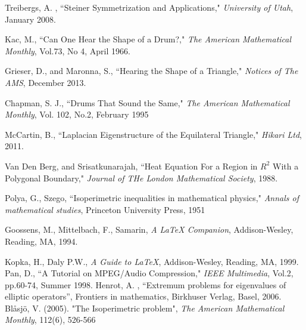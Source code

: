 \documentclass[12pt]{report}
\numberwithin{definition}{section}
\begin{document}
 \begin{thebibliography}{100}
  \singlespacing
   Treibergs, A. , ``Steiner Symmetrization and Applications," \emph{University of Utah},  January 2008.
 
  Kac, M., ``Can One Hear the Shape of a Drum?," \emph{The American Mathematical Monthly}, Vol.73, No 4, April 1966.
 
 
  Grieser, D., and Maronna, S., ``Hearing the Shape of a Triangle," \emph{Notices of The AMS}, December 2013.
 
  Chapman, S. J., ``Drums That Sound the Same," \emph{The American Mathematical Monthly}, Vol. 102, No.2, February 1995
 
  McCartin, B., ``Laplacian Eigenstructure of the Equilateral Triangle," \emph{Hikari Ltd}, 2011.

 Van Den Berg, and Srisatkunarajah, ``Heat Equation For a Region in $R^2$ With  a Polygonal Boundary," \emph{Journal of THe London Mathematical Society}, 1988.
 

 
 Polya, G., Szego, ``Isoperimetric inequalities in mathematical physics," \emph{Annals of mathematical studies}, Princeton University Press, 1951

 Goossens, M., Mittelbach, F., Samarin, \emph{A LaTeX Companion}, Addison-Wesley, Reading, MA, 1994.

 Kopka, H., Daly P.W., \emph{A Guide to LaTeX}, Addison-Wesley, Reading, MA, 1999.
 Pan, D., ``A Tutorial on MPEG/Audio Compression," \emph{IEEE Multimedia}, Vol.2, pp.60-74, Summer 1998.
  Henrot, A. , “Extremum problems for eigenvalues of elliptic operators”, Frontiers in mathematics, Birkhuser Verlag, Basel, 2006.
   Blåsjö, V. (2005). "The Isoperimetric problem", \emph{The American Mathematical Monthly}, 112(6), 526-566
\end{thebibliography}



 
 
 
\end{document}
